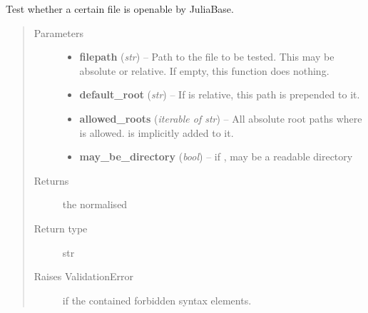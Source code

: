 \documentclass[a4paper,11pt,english]{sphinxmanual}
\begin{document}
\begin{fulllineitems}
\label{programming/utilities:jb_common.utils.base.check_filepath}
Test whether a certain file is openable by JuliaBase.
\begin{quote}\begin{description}
\item[{Parameters}] \leavevmode\begin{itemize}
\item {} 
\textbf{filepath} (\emph{str}) -- Path to the file to be tested.  This may be absolute or
relative.  If empty, this function does nothing.

\item {} 
\textbf{default\_root} (\emph{str}) -- If  is relative, this path is prepended to
it.

\item {} 
\textbf{allowed\_roots} (\emph{iterable of str}) -- All absolute root paths where  is allowed.
 is implicitly added to it.

\item {} 
\textbf{may\_be\_directory} (\emph{bool}) -- if ,  may be a readable directory

\end{itemize}

\item[{Returns}] \leavevmode
the normalised 

\item[{Return type}] \leavevmode
str

\item[{Raises ValidationError}] \leavevmode
if the  contained forbidden syntax
elements.

\end{description}\end{quote}

\end{fulllineitems}

\end{document}

